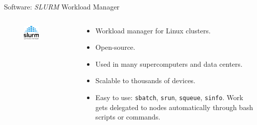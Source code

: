 
\begin{frame}{Software: \textit{SLURM} Workload Manager}
    \begin{columns}
        \begin{column}{0.4\textwidth}
            \begin{figure}
                \centering
                \includegraphics[width=0.5\textwidth]{images/slurm_logo.png}
            \end{figure}
        \end{column}
        \begin{column}{0.6\textwidth}
            \begin{itemize}
                \item Workload manager for Linux clusters.
                \item Open-source.
                \item Used in many supercomputers and data centers.
                \item Scalable to thousands of devices.
                \item Easy to use: \texttt{sbatch}, \texttt{srun}, \texttt{squeue}, \texttt{sinfo}.
                      Work gets delegated to nodes automatically through bash scripts or commands.
            \end{itemize}
        \end{column}
    \end{columns}
\end{frame}

